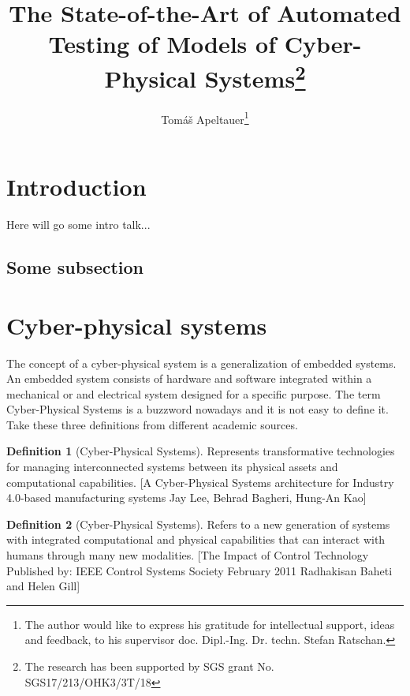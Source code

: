\documentclass[english,technical,10pt]{FITreport}[2018/01/26]
\title{The State-of-the-Art of Automated Testing of Models of Cyber-Physical Systems\thanks{The research has been supported by SGS grant No. SGS17/213/OHK3/3T/18}}
\author{Tomáš Apeltauer\thanks{The author would like to express his gratitude for intellectual support, ideas and feedback, to his supervisor doc. Dipl.-Ing. Dr. techn. Stefan Ratschan.}\affil{Department of Digital Design\\\theFIT}
	}
\begin{document}
\theoremstyle{definition}
\newtheorem{lemma}{Lemma}
\newtheorem{theorem}[lemma]{Theorem}
\newtheorem{definition}[lemma]{Definition}
\newtheorem{preposition}[lemma]{Preposition}
\newtheorem{example}[lemma]{Example}
\newtheorem{corollary}[lemma]{Corollary}
\newtheorem{proposition}[lemma]{Proposition}
\newtheorem{property}[lemma]{Property}
\newtheorem{observation}[lemma]{Observation}
\theoremstyle{remark}
\newtheorem{notation}[lemma]{Notation}
\newtheorem{note}[lemma]{Note}




\section{Introduction}

Here will go some intro talk...

\subsection{Some subsection}


\section{Cyber-physical systems}

The concept of a cyber-physical system is a generalization of embedded systems. An embedded system consists of hardware and software integrated within a mechanical or and electrical system designed for a specific purpose. The term Cyber-Physical Systems is a buzzword  nowadays and it is not easy to define it. Take these three definitions from different academic sources.

\begin{definition}[Cyber-Physical Systems]
    Represents transformative technologies for managing interconnected systems between its physical assets and computational capabilities. [A Cyber-Physical Systems architecture for Industry 4.0-based manufacturing systems Jay Lee, Behrad Bagheri, Hung-An Kao]
\end{definition}

\begin{definition}[Cyber-Physical Systems]
    Refers to a new generation of systems with integrated computational and physical capabilities that can interact with humans through many new modalities. [The Impact of Control Technology Published by: IEEE Control Systems Society February 2011 Radhakisan Baheti and Helen Gill]

\end{definition}
\end{document}
